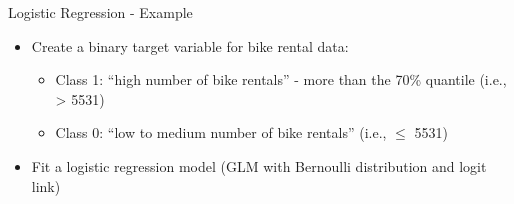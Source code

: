 \documentclass[11pt,compress,t,notes=noshow, aspectratio=169, xcolor=table]{beamer}
\begin{document}
\begin{frame}{Logistic Regression - Example}

\begin{itemize}
    \item Create a binary target variable for bike rental data:
    \begin{itemize}
        \item Class 1: ``high number of bike rentals'' - more than the 70\% quantile (i.e.,  > 5531)
        \item Class 0: ``low to medium number of bike rentals'' (i.e.,  $\leq$ 5531)
    \end{itemize}
    \item Fit a logistic regression model (GLM with Bernoulli distribution and logit link)
\end{itemize}


\end{frame}
\end{document}
